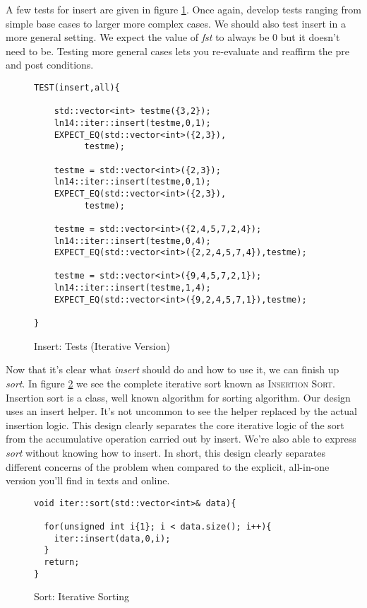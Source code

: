 \documentclass[]{tufte-handout}
\begin{document}
A few tests for insert are given in figure \ref{code:insertitertests}. 	Once again, develop tests ranging from simple base cases to larger more complex cases. We should also test insert in a more general setting. We expect the value of \textit{fst} to always be 0 but it doesn't need to be. Testing more general cases lets you re-evaluate and reaffirm the pre and post conditions.
\begin{figure}
\begin{lstlisting}
TEST(insert,all){

    std::vector<int> testme({3,2});
    ln14::iter::insert(testme,0,1);
    EXPECT_EQ(std::vector<int>({2,3}),
	      testme);

    testme = std::vector<int>({2,3});
    ln14::iter::insert(testme,0,1);
    EXPECT_EQ(std::vector<int>({2,3}),
	      testme);

    testme = std::vector<int>({2,4,5,7,2,4});
    ln14::iter::insert(testme,0,4);
    EXPECT_EQ(std::vector<int>({2,2,4,5,7,4}),testme);

    testme = std::vector<int>({9,4,5,7,2,1});
    ln14::iter::insert(testme,1,4);
    EXPECT_EQ(std::vector<int>({9,2,4,5,7,1}),testme);

}
\end{lstlisting}
\label{code:insertitertests}
\caption{Insert: Tests (Iterative Version)}
\end{figure}

Now that it's clear what \textit{insert} should do and how to use it, we can finish up \textit{sort}. In figure \ref{code:sortiter} we see the complete iterative sort known as \textsc{Insertion Sort}. Insertion sort is a class, well known algorithm for sorting algorithm. Our design uses an insert helper. It's not uncommon to see the helper replaced by the actual insertion logic. This design clearly separates the core iterative logic of the sort from the accumulative operation carried out by insert. We're also able to express \textit{sort} without knowing how to insert. In short, this design clearly separates different concerns of the problem when compared to the explicit, all-in-one version you'll find in texts and online.

\begin{figure}[htbp!]
\begin{lstlisting}
void iter::sort(std::vector<int>& data){

  for(unsigned int i{1}; i < data.size(); i++){
    iter::insert(data,0,i);
  }
  return;
}
\end{lstlisting}
\label{code:sortiter}
\caption{Sort: Iterative Sorting}
\end{figure}
\end{document}
